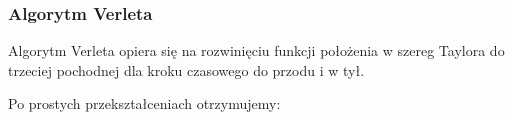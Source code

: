 
\subsubsection {Algorytm Verleta}
Algorytm Verleta opiera się na rozwinięciu funkcji położenia w szereg Taylora do trzeciej pochodnej dla kroku czasowego do przodu i w tył.
\linebreak

\begin{center}

\end{center}

Po prostych przekształceniach otrzymujemy:
\begin{center}

\end{center}

